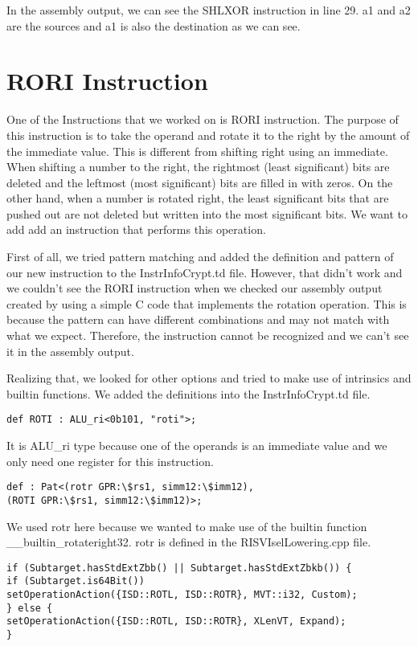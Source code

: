 In the assembly output, we can see the SHLXOR instruction in line 29. a1 and a2 are the sources and a1 is also the destination as we can see.

\section{RORI Instruction}
One of the Instructions that we worked on is RORI instruction. The purpose of this instruction is to take the operand and rotate it to the right by the amount of the immediate value. This is different from shifting right using an immediate. When shifting a number to the right, the rightmost (least significant) bits are deleted and the leftmost (most significant) bits are filled in with zeros. On the other hand, when a number is rotated right, the least significant bits that are pushed out are not deleted but written into the most significant bits. We want to add add an instruction that performs this operation.

First of all, we tried pattern matching and added the definition and pattern of our new instruction to the InstrInfoCrypt.td file. However, that didn’t work and we couldn’t see the RORI instruction when we checked our assembly output created by using a simple C code that implements the rotation operation. This is because the pattern can have different combinations and may not match with what we expect. Therefore, the instruction cannot be recognized and we can’t see it in the assembly output.

Realizing that, we looked for other options and tried to make use of intrinsics and builtin functions. We added the definitions into the InstrInfoCrypt.td file.

\begin{lstlisting}
def ROTI : ALU_ri<0b101, "roti">;
\end{lstlisting}

It is ALU\_ri type because one of the operands is an immediate value and we only need one register for this instruction.

\begin{lstlisting}
def : Pat<(rotr GPR:\$rs1, simm12:\$imm12),
(ROTI GPR:\$rs1, simm12:\$imm12)>;
\end{lstlisting}

We used rotr here because we wanted to make use of the builtin function \_\_builtin\_rotateright32. rotr is defined in the RISVIselLowering.cpp file.

\begin{lstlisting}
if (Subtarget.hasStdExtZbb() || Subtarget.hasStdExtZbkb()) {
if (Subtarget.is64Bit())
setOperationAction({ISD::ROTL, ISD::ROTR}, MVT::i32, Custom);
} else {
setOperationAction({ISD::ROTL, ISD::ROTR}, XLenVT, Expand); 
}
\end{lstlisting}

